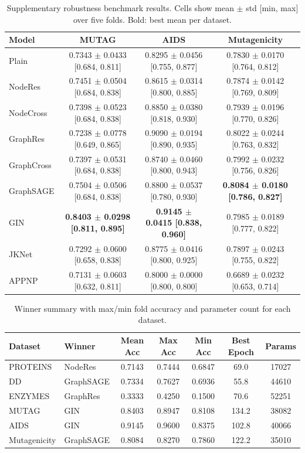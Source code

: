 \begin{table}[t]
\centering
\footnotesize
\setlength{\tabcolsep}{4pt}
\caption{Supplementary robustness benchmark results. Cells show mean $\pm$ std [min, max] over five folds. Bold: best mean per dataset.}
\label{tab:all_results_2}
\begin{tabular}{lccc}
\toprule
Model & MUTAG & AIDS & Mutagenicity \\
\midrule
Plain & 0.7343 $\pm$ 0.0433 [0.684, 0.811] & 0.8295 $\pm$ 0.0456 [0.755, 0.877] & 0.7830 $\pm$ 0.0170 [0.764, 0.812] \\
NodeRes & 0.7451 $\pm$ 0.0504 [0.684, 0.838] & 0.8615 $\pm$ 0.0314 [0.800, 0.885] & 0.7874 $\pm$ 0.0142 [0.769, 0.809] \\
NodeCross & 0.7398 $\pm$ 0.0523 [0.684, 0.838] & 0.8850 $\pm$ 0.0380 [0.818, 0.930] & 0.7939 $\pm$ 0.0196 [0.770, 0.826] \\
GraphRes & 0.7238 $\pm$ 0.0778 [0.649, 0.865] & 0.9090 $\pm$ 0.0194 [0.890, 0.935] & 0.8022 $\pm$ 0.0244 [0.763, 0.832] \\
GraphCross & 0.7397 $\pm$ 0.0531 [0.684, 0.838] & 0.8740 $\pm$ 0.0460 [0.800, 0.943] & 0.7992 $\pm$ 0.0232 [0.756, 0.826] \\
GraphSAGE & 0.7504 $\pm$ 0.0506 [0.684, 0.838] & 0.8800 $\pm$ 0.0537 [0.780, 0.930] & \textbf{0.8084 $\pm$ 0.0180 [0.786, 0.827]} \\
GIN & \textbf{0.8403 $\pm$ 0.0298 [0.811, 0.895]} & \textbf{0.9145 $\pm$ 0.0415 [0.838, 0.960]} & 0.7985 $\pm$ 0.0189 [0.777, 0.822] \\
JKNet & 0.7292 $\pm$ 0.0600 [0.658, 0.838] & 0.8775 $\pm$ 0.0416 [0.800, 0.925] & 0.7897 $\pm$ 0.0243 [0.755, 0.822] \\
APPNP & 0.7131 $\pm$ 0.0603 [0.632, 0.811] & 0.8000 $\pm$ 0.0000 [0.800, 0.800] & 0.6689 $\pm$ 0.0232 [0.653, 0.714] \\
\bottomrule
\end{tabular}
\end{table}

\begin{table}[t]
\centering
\small
\caption{Winner summary with max/min fold accuracy and parameter count for each dataset.}
\label{tab:all_winners}
\begin{tabular}{l l c c c c c}
\toprule
Dataset & Winner & Mean Acc & Max Acc & Min Acc & Best Epoch & Params \\
\midrule
PROTEINS & NodeRes & 0.7143 & 0.7444 & 0.6847 & 69.0 & 17027 \\
DD & GraphSAGE & 0.7334 & 0.7627 & 0.6936 & 55.8 & 44610 \\
ENZYMES & GraphRes & 0.3333 & 0.4250 & 0.1500 & 70.6 & 52251 \\
MUTAG & GIN & 0.8403 & 0.8947 & 0.8108 & 134.2 & 38082 \\
AIDS & GIN & 0.9145 & 0.9600 & 0.8375 & 102.8 & 40066 \\
Mutagenicity & GraphSAGE & 0.8084 & 0.8270 & 0.7860 & 122.2 & 35010 \\
\bottomrule
\end{tabular}
\end{table}
